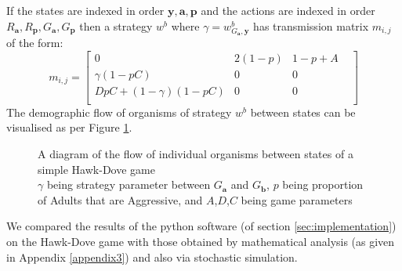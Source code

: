 If the states are indexed in order $\mathbf{y},\mathbf{a},\mathbf{p}$ and the actions are indexed in order $R_\mathbf{a},R_\mathbf{p},G_\mathbf{a},G_\mathbf{p}$ then a strategy $w^b$ where $\gamma = w^b_{G_\mathbf{a},\mathbf{y}}$ has transmission matrix $m_{i,j}$ of the form:
\begin{equation}\label{eq:hd_transmission} m_{i,j} = \begin{bmatrix}
    0 & 2(1-p) & 1-p+A & \\
    \gamma(1-pC) & 0 & 0  & \\
     DpC+(1-\gamma)(1-pC)  & 0 & 0  & \\
\end{bmatrix} \end{equation}
The demographic flow of organisms of strategy $w^b$ between states can be visualised as per Figure \ref{fig:flow}.
\begin{figure}[]
\begin{center}
\end{center}
\caption{A diagram of the flow of individual organisms between states of a simple Hawk-Dove game\\$\gamma$ being strategy parameter between $G_\mathbf{a}$ and $G_\mathbf{b}$, $p$ being proportion of Adults that are Aggressive, and $A$,$D$,$C$ being game parameters}
\label{fig:flow}
\end{figure}

We compared the results of the python software (of section \ref{sec:implementation}) on the Hawk-Dove game with those obtained by mathematical analysis (as given in Appendix \ref{appendix3}) and also via stochastic simulation.

